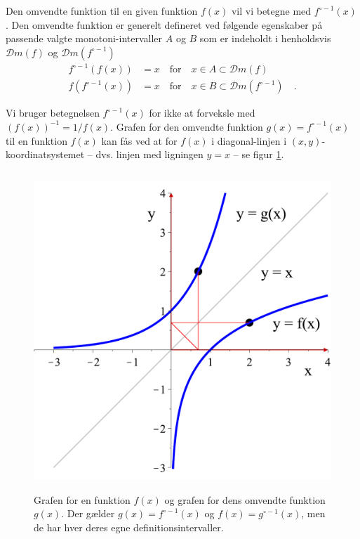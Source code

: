 \begin{definition}
Den omvendte funktion til en given funktion $f(x)$ vil vi betegne med  $f^{\circ -1}(x)$. Den omvendte funktion er generelt defineret ved følgende egenskaber på passende valg\-te monotoni-intervaller $A$ og $B$ som er indeholdt i henholdsvis $\mathcal{D}m(f)$ og $\mathcal{D}m(f^{\circ -1})$
\begin{equation}
\begin{aligned}
f^{\circ -1}(f(x)) &= x \quad \textrm{for} \quad x \in A \subset \mathcal{D}m(f)\\
f(f^{\circ -1}(x)) &= x \quad \textrm{for} \quad x \in B \subset \mathcal{D}m(f^{\circ -1})\quad.
\end{aligned}
\end{equation}
\end{definition}

\begin{obs}
Vi bruger betegnelsen  $f^{\circ -1}(x)$ for ikke at forveksle med $(f(x))^{-1} = 1/f(x)$.
Grafen for den omvendte funktion $g(x) = f^{\circ -1}(x)$  til en  funktion $f(x)$ kan fås ved at  for $f(x)$ i diagonal-linjen i $(x,y)$-koordinatsystemet -- dvs. linjen med ligningen $y = x$ --  se figur \ref{tn14.figOmvendt}.
\end{obs}
\begin{figure}[h]
\centerline{\includegraphics[height=120mm]{FIGS/plotOmvendt.pdf}}
\begin{center}
\caption{Grafen for en funktion $f(x)$ og grafen for dens omvendte funktion $g(x)$. Der gælder $g(x) = f^{\circ-1}(x)$ og $f(x) = g^{\circ-1}(x)$, men de har hver deres egne definitionsintervaller.} \label{tn14.figOmvendt}
\end{center}
\end{figure}


